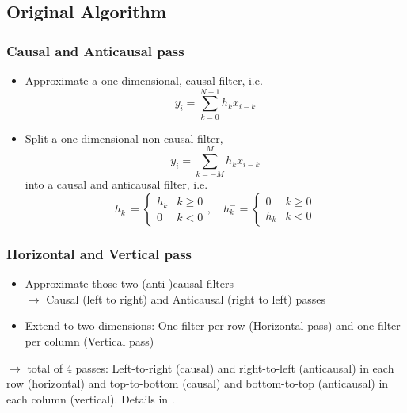 \documentclass{beamer}
\begin{document}
\subsection{Original Algorithm}
\begin{frame}
\frametitle{Causal and Anticausal pass}

\begin{itemize}
  \item Approximate a one dimensional, causal filter, i.e.
    \begin{equation}
      y_i = \sum_{k = 0}^{N-1} h_k x_{i - k}
    \end{equation}
  \item Split a one dimensional non causal filter,
    \begin{equation}
      y_i = \sum_{k = -M}^{M} h_k x_{i - k}
    \end{equation}
    into a causal and anticausal filter, i.e.
    \begin{equation}
      h^+_k = \begin{cases}
        h_k & k \ge 0 \\
        0 & k < 0
      \end{cases},
      \quad
      h^-_k = \begin{cases}
        0 & k \ge 0 \\
        h_k & k < 0
      \end{cases}
    \end{equation}
      
\end{itemize}
\end{frame}

\begin{frame}
\frametitle{Horizontal and Vertical pass}

\begin{itemize}
  \item Approximate those two (anti-)causal filters \\$\to$ Causal (left to
    right) and Anticausal (right to left) passes
  \item Extend to two dimensions: One filter per row (Horizontal pass) and
    one filter per column (Vertical pass)
\end{itemize}
  $\to$ total of $4$ passes: Left-to-right (causal) and right-to-left
    (anticausal) in each row (horizontal) and top-to-bottom (causal) and
    bottom-to-top (anticausal) in each column (vertical). Details in
    \cite{deriche}.
\end{frame}
\end{document}
